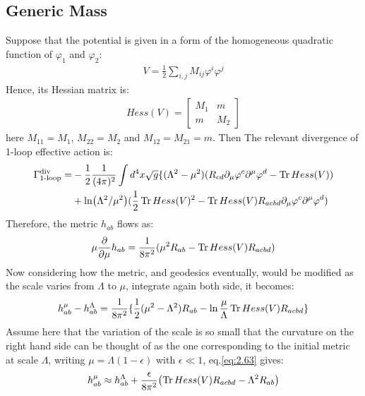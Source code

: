 \subsection{Generic Mass}
Suppose that the potential is given in a form of the homogeneous quadratic function of $\varphi_{1}$ and $\varphi _{2}$:
\begin{align}
    V= \frac{1}{2} \sum_{i,j} M_{ij} \varphi^{i} \varphi^{j}
\end{align}
Hence, its Hessian matrix is:
\begin{align}
    Hess(V) = 
    \begin{bmatrix}
        M_{1} & m \\
        m & M_{2}
    \end{bmatrix}
\end{align}
here $M_{11} = M_1$, $M_{22} = M_{2}$ and $M_{12} = M_{21} = m$. Then The relevant divergence of 1-loop effective action is:
\begin{align}
    \begin{split}
        \Gamma _{\text{1-loop}}^{\text{div}} = & -\frac{1}{2} \frac{1}{(4\pi)^2} \int d^{4}x \sqrt{g} \lbrace (\Lambda ^{2} - \mu ^{2})(R_{cd} \partial _{\mu} \varphi ^{c} \partial ^{\mu} \varphi ^{d} - \Tr Hess(V)) \\
        & + \ln (\Lambda ^{2} / \mu ^{2}) (\frac{1}{2} \Tr Hess(V)^{2}  - \Tr Hess(V) R_{acbd} \partial _{\mu} \varphi ^{c} \partial ^{\mu} \varphi ^{d})
    \end{split}
\end{align}
Therefore, the metric $h_{ab}$ flows as:
\begin{align}
    \mu \pdv{\mu} h_{ab} = \frac{1}{8\pi^2} (\mu ^{2} R_{ab} - \Tr Hess(V) R_{acbd})
\end{align}
Now considering how the metric, and geodesics eventually, would be modified as the scale varies from $\Lambda$ to $\mu$, integrate again both side, it becomes:
\begin{align}
    \label{eq:2.63}
    h_{ab} ^{\mu} - h_{ab} ^{\Lambda} = \frac{1}{8\pi^{2}}\lbrace \frac{1}{2}(\mu ^{2} - \Lambda ^{2}) R_{ab} - \ln \frac{\mu}{\Lambda} \Tr Hess(V) R_{acbd} \rbrace
\end{align}
Assume here that the variation of the scale is so small that the curvature on the right hand side can be thought of as the one corresponding to the initial metric at scale $\Lambda$, writing $\mu = \Lambda (1-\epsilon)$ with $\epsilon \ll 1$, eq.\ref{eq:2.63} gives:
\begin{align}
    h_{ab} ^{\mu} \approx h_{ab} ^{\Lambda} + \frac{\epsilon}{8\pi ^{2}}  \qty (\Tr Hess(V) R_{acbd} - \Lambda ^{2} R_{ab})
\end{align}
